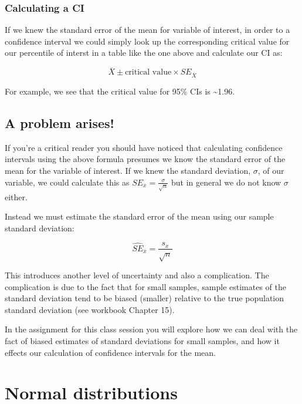 \documentclass[]{book}
\theoremstyle{definition}
\theoremstyle{definition}
\theoremstyle{definition}
\theoremstyle{remark}
\begin{document}
\hypertarget{calculating-a-ci}{%
\subsection{Calculating a CI}\label{calculating-a-ci}}

If we knew the standard error of the mean for variable of interest, in
order to a confidence interval we could simply look up the corresponding
critical value for our percentile of interst in a table like the one
above and calculate our CI as:

\[
\overline{X} \pm \text{critical value} \times SE_{\overline{X}}
\]

For example, we see that the critical value for 95\% CIs is
\textasciitilde{}1.96.

\hypertarget{a-problem-arises}{%
\section{A problem arises!}\label{a-problem-arises}}

If you're a critical reader you should have noticed that calculating
confidence intervals using the above formula presumes we know the
standard error of the mean for the variable of interest. If we knew the
standard deviation, \(\sigma\), of our variable, we could calculate this
as \(SE_{\overline{x}} = \frac{\sigma}{\sqrt{n}}\) but in general we do
not know \(\sigma\) either.

Instead we must estimate the standard error of the mean using our sample
standard deviation:

\[
\widehat{SE}_{\overline{x}} = \frac{s_x}{\sqrt{n}}
\]

This introduces another level of uncertainty and also a complication.
The complication is due to the fact that for small samples, sample
estimates of the standard deviation tend to be biased (smaller) relative
to the true population standard deviation (see workbook Chapter 15).

In the assignment for this class session you will explore how we can
deal with the fact of biased estimates of standard deviations for small
samples, and how it effects our calculation of confidence intervals for
the mean.

\hypertarget{normal-distributions}{%
\chapter{Normal distributions}\label{normal-distributions}}
\end{document}
